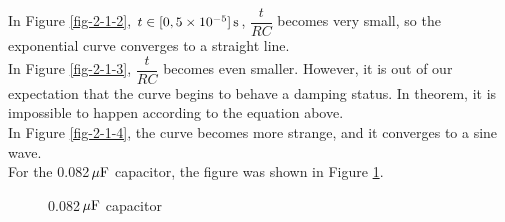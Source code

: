 \documentclass{article}
\newcommand{\unit}[1]{{\rm\,#1}}
\begin{document}
In Figure \ref{fig-2-1-2}, $t\in[0,5\times10^{-5}]\unit{s}$, $\dfrac{t}{RC}$ becomes very small, so the exponential curve converges to a straight line.\\[-0.5em]

In Figure \ref{fig-2-1-3}, $\dfrac{t}{RC}$ becomes even smaller. However, it is out of our expectation that the curve begins to behave a damping status. In theorem, it is impossible to happen according to the equation above.\\[-0.5em]

In Figure \ref{fig-2-1-4}, the curve becomes more strange, and it converges to a sine wave. \\


For the 0.082$\unit{\mu F}$ capacitor, the figure was shown in Figure \ref{fig-2-2}.

\begin{figure}[htbp]
	\centering
	\caption{0.082$\unit{\mu F}$ capacitor}
	\label{fig-2-2}
\end{figure}
\end{document}

